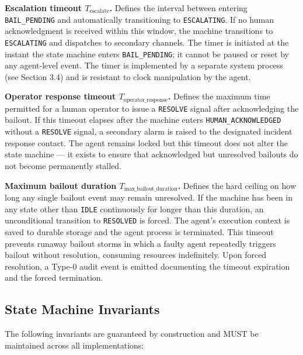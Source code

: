 \bigskip

\noindent\textbf{Escalation timeout $T_{\text{escalate}}$.} Defines the interval between entering \texttt{BAIL\_PENDING} and automatically transitioning to \texttt{ESCALATING}. If no human acknowledgment is received within this window, the machine transitions to \texttt{ESCALATING} and dispatches to secondary channels. The timer is initiated at the instant the state machine enters \texttt{BAIL\_PENDING}; it cannot be paused or reset by any agent-level event. The timer is implemented by a separate system process (see Section 3.4) and is resistant to clock manipulation by the agent.

\bigskip

\noindent\textbf{Operator response timeout $T_{\text{operator\_response}}$.} Defines the maximum time permitted for a human operator to issue a \texttt{RESOLVE} signal after acknowledging the bailout. If this timeout elapses after the machine enters \texttt{HUMAN\_ACKNOWLEDGED} without a \texttt{RESOLVE} signal, a secondary alarm is raised to the designated incident response contact. The agent remains locked but this timeout does not alter the state machine — it exists to ensure that acknowledged but unresolved bailouts do not become permanently stalled.

\bigskip

\noindent\textbf{Maximum bailout duration $T_{\text{max\_bailout\_duration}}$.} Defines the hard ceiling on how long any single bailout event may remain unresolved. If the machine has been in any state other than \texttt{IDLE} continuously for longer than this duration, an unconditional transition to \texttt{RESOLVED} is forced. The agent's execution context is saved to durable storage and the agent process is terminated. This timeout prevents runaway bailout storms in which a faulty agent repeatedly triggers bailout without resolution, consuming resources indefinitely. Upon forced resolution, a Type-0 audit event is emitted documenting the timeout expiration and the forced termination.

\bigskip

\subsection{State Machine Invariants}

The following invariants are guaranteed by construction and MUST be maintained across all implementations:

